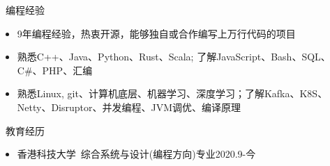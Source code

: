\documentclass[UTF8]{resume}
\begin{document}
  

\begin{rSection}{\faCogs~编程经验}
    \begin{itemize}
        \itemsep -0.5em \vspace{-0.5em}
        \item 9年编程经验，热衷开源，能够独自或合作编写上万行代码的项目
        \item 熟悉C++、Java、Python、Rust、Scala; 了解JavaScript、Bash、SQL、C\#、PHP、汇编
        \item 熟悉Linux, git、计算机底层、机器学习、深度学习；了解Kafka、K8S、Netty、Disruptor、并发编程、JVM调优、编译原理
    \end{itemize}
    
\end{rSection}
\begin{rSection}{\faGraduationCap~教育经历}
    \begin{itemize}
        \item 香港科技大学~综合系统与设计(编程方向)专业\hfill 2020.9-今
    \end{itemize}
\end{rSection}
\end{document}
